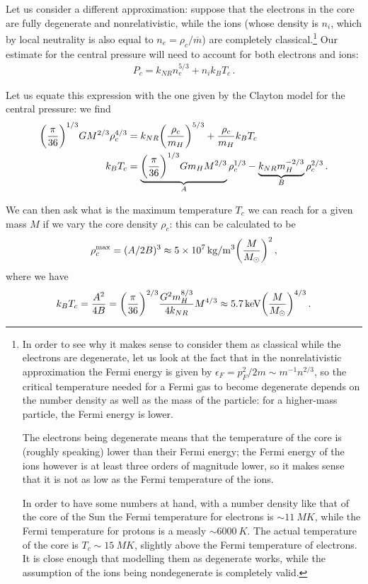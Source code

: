 \documentclass[main.tex]{subfiles}
\begin{document}
Let us consider a different approximation: suppose that the electrons in the core are fully degenerate and nonrelativistic, while the ions (whose density is \(n_i\), which by local neutrality is also equal to \(n_e = \rho _c / \overline{m}\)) are completely classical.\footnote{In order to see why it makes sense to consider them as classical while the electrons are degenerate, let us look at the fact that in the nonrelativistic approximation the Fermi energy is given by \(\epsilon _F = p_F^2 / 2m \sim m^{-1} n^{2/3}\), so the critical temperature needed for a Fermi gas to become degenerate depends on the number density as well as the mass of the particle: for a higher-mass particle, the Fermi energy is lower.

The electrons being degenerate means that the temperature of the core is (roughly speaking) lower than their Fermi energy; the Fermi energy of the ions however is at least three orders of magnitude lower, so it makes sense that it is not as low as the Fermi temperature of the ions.

In order to have some numbers at hand, with a number density like that of the core of the Sun the Fermi temperature for electrons is \(\sim \SI{11}{MK}\), while the Fermi temperature for protons is a measly \(\sim \SI{6000}{K}\). The actual temperature of the core is \(T_c \sim \SI{15}{MK}\), slightly above the Fermi temperature of electrons. It is close enough that modelling them as degenerate works, while the assumption of the ions being nondegenerate is completely valid.}
Our estimate for the central pressure will need to account for both electrons and ions:
%
\begin{align}
  P_c = k_{NR} n_{e}^{5/3} + n_i k_B T_c
\,.
\end{align}
%

Let us equate this expression with the one given by the Clayton model for the central pressure: we find
%
\begin{align}
  \qty(\frac{\pi}{36})^{1/3} G M^{2/3} \rho_{c}^{4/3}
  &= k_{NR} \qty(\frac{\rho_c}{m_{H}})^{5/3} + \frac{\rho_{c}}{m_H} k_B T_c \\
  k_B T_c &= \underbrace{\qty(\frac{\pi}{36})^{1/3} G m_{H} M^{2/3}}_{A} \rho_{c}^{1/3} - \underbrace{k_{NR} m_H^{-2/3}}_{B} \rho _c^{2/3}
\,.
\end{align}
%

We can then ask what is the maximum temperature \(T_c\) we can reach for a given mass \(M\) if we vary the core density \(\rho _c\):
this can be calculated to be 
%
\begin{align}
\rho_{c}^{\text{max}} = (A/ 2B)^{3} \approx \SI{5e7}{kg/m^3} \qty( \frac{M}{M_{\odot}})^2
\,,
\end{align}
%
where we have 
%
\begin{align}
  k_B T_c = \frac{A^2}{4B} = \qty(\frac{\pi }{36})^{2/3} \frac{G^2m_H^{8/3}}{4 k_{NR}} M^{4/3}
  \approx \SI{5.7}{keV} \qty( \frac{M}{M_{\odot}})^{4/3}
\,.
\end{align}
\end{document}
